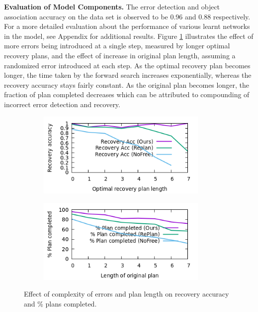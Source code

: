 %
\textbf{Evaluation of Model Components. }
%
The error detection and object association accuracy on the data set is observed to be 0.96 and 0.88 respectively. For a more detailed evaluation about the performance of various learnt networks in the model, see Appendix for additional results. 
%
Figure \ref{fig:graphs} illustrates the effect of more errors being introduced at a single step, measured by longer optimal recovery plans, and the effect of increase in original plan length, assuming a randomized error introduced at each step. As the optimal recovery plan becomes longer, the time taken by the forward search increases exponentially, whereas the recovery accuracy stays fairly constant. As the original plan becomes longer, the fraction of plan completed decreases which can be attributed to compounding of incorrect error detection and recovery.

\begin{figure}[t!]
    \begin{subfigure}{0.5\hsize}
       \centering    \includegraphics[width=0.9\textwidth]{figures/trend_errors.png}
    \end{subfigure}
    \begin{subfigure}{0.5\hsize}
       \centering    \includegraphics[width=0.9\textwidth]{figures/trend_steps.png}
    \end{subfigure}
    \caption{
        \footnotesize{
            Effect of complexity of errors and plan length on recovery accuracy and \% plans completed. %
        }
    }
    \label{fig:graphs}
    \vspace{-0.15in}
\end{figure}

